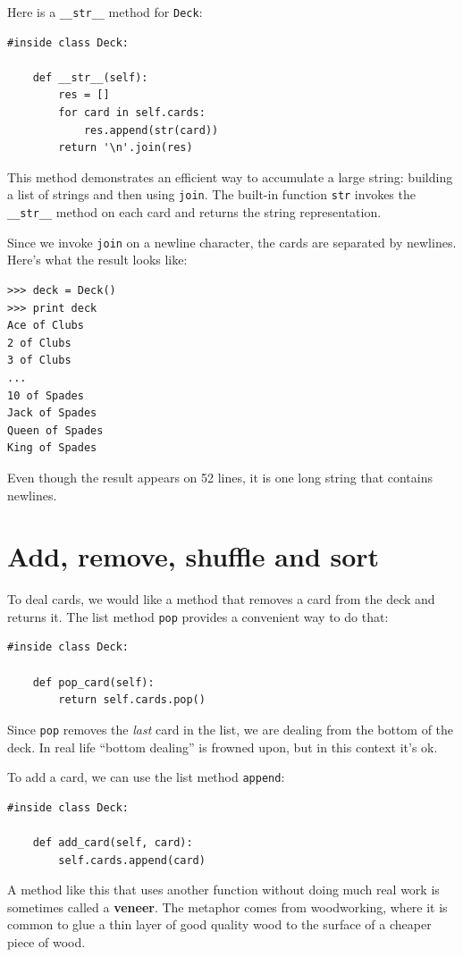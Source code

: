 \documentclass[10pt]{book}
\begin{document}
Here is a \verb"__str__" method for {\tt Deck}:

\begin{verbatim}
#inside class Deck:

    def __str__(self):
        res = []
        for card in self.cards:
            res.append(str(card))
        return '\n'.join(res)
\end{verbatim}
%
This method demonstrates an efficient way to accumulate a large
string: building a list of strings and then using {\tt join}.
The built-in function {\tt str} invokes the \verb"__str__"
method on each card and returns the string representation.

Since we invoke {\tt join} on a newline character, the cards
are separated by newlines.  Here's what the result looks like:

\begin{verbatim}
>>> deck = Deck()
>>> print deck
Ace of Clubs
2 of Clubs
3 of Clubs
...
10 of Spades
Jack of Spades
Queen of Spades
King of Spades
\end{verbatim}
%
Even though the result appears on 52 lines, it is
one long string that contains newlines.


\section{Add, remove, shuffle and sort}

To deal cards, we would like a method that
removes a card from the deck and returns it.
The list method {\tt pop} provides a convenient way to do that:

\begin{verbatim}
#inside class Deck:

    def pop_card(self):
        return self.cards.pop()
\end{verbatim}
%
Since {\tt pop} removes the {\em last} card in the list, we are
dealing from the bottom of the deck.  In real life ``bottom dealing'' is
frowned upon,
but in this context it's ok.

To add a card, we can use the list method {\tt append}:

\begin{verbatim}
#inside class Deck:

    def add_card(self, card):
        self.cards.append(card)
\end{verbatim}
%
A method like this that uses another function without doing
much real work is sometimes called a {\bf veneer}.  The metaphor
comes from woodworking, where it is common to glue a thin
layer of good quality wood to the surface of a cheaper piece of
wood.
\end{document}

